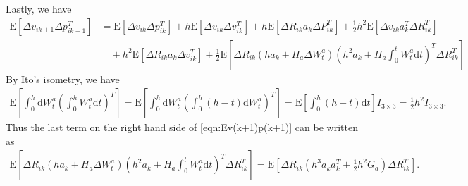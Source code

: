 \documentclass[10pt]{article}
\newcommand{\expect}[1]{\ensuremath{\mathrm{E}\left[ #1 \right]}}
\newcommand{\diff}[1]{\ensuremath{\mathrm{d} #1}}
\begin{document}
Lastly, we have
\color{blue}
\begin{align} \label{eqn:Ev(k+1)p(k+1)}
	\expect{\Delta v_{ik+1} \Delta p_{ik+1}^T} &= \expect{\Delta v_{ik} \Delta p_{ik}^T} + h\expect{\Delta v_{ik} \Delta v_{ik}^T} + h\expect{\Delta R_{ik}a_k\Delta P_{ik}^T} + \tfrac{1}{2}h^2\expect{\Delta v_{ik}a_k^T\Delta R_{ik}^T} \nonumber \\
	&\quad + h^2\expect{\Delta R_{ik}a_k\Delta v_{ik}^T} + \tfrac{1}{2} \expect{\Delta R_{ik}(ha_k + H_a\Delta W_t^a) \left(h^2a_k + H_a\int_0^t W_t^a\diff{t}\right)^T \Delta R_{ik}^T}
\end{align}
\color{black}
By Ito's isometry, we have
\begin{align*}
	\expect{\int_0^h \diff{W_t^a} \left( \int_0^h W_t^a \diff{t} \right)^T} = \expect{\int_0^h \diff{W_t^a} \left( \int_0^h (h-t) \diff{W_t^a} \right)^T} 
	=\expect{\int_0^h (h-t) \diff{t}} I_{3\times 3} = \tfrac{1}{2}h^2I_{3\times 3}.
\end{align*}
Thus the last term on the right hand side of \eqref{eqn:Ev(k+1)p(k+1)} can be written as
\begin{align}
	\expect{\Delta R_{ik}(ha_k + H_a\Delta W_t^a) \left(h^2a_k + H_a\int_0^t W_t^a\diff{t}\right)^T \Delta R_{ik}^T} = \expect{\Delta R_{ik} \left(h^3a_ka_k^T + \tfrac{1}{2}h^2G_a\right) \Delta R_{ik}^T}.
\end{align}
\end{document}
